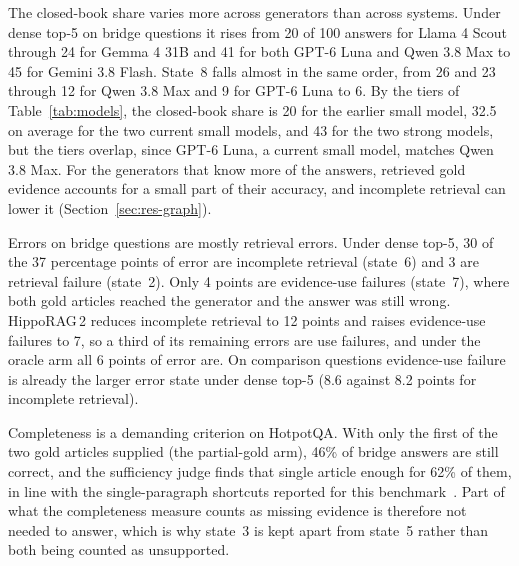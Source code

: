 \documentclass[preprint,12pt]{elsarticle}
\begin{document}
The closed-book share varies more across generators than across systems.
Under dense top-5 on bridge questions it rises from 20 of 100 answers for
Llama 4 Scout through 24 for Gemma 4 31B and 41 for both GPT-6 Luna and Qwen
3.8 Max to 45 for Gemini 3.8 Flash. State~8 falls almost in the same order, from
26 and 23 through 12 for Qwen 3.8 Max and 9 for GPT-6 Luna to 6. By the tiers of
Table~\ref{tab:models}, the closed-book share is 20 for the earlier small model,
32.5 on average for the two current small models, and 43 for the two strong
models, but the tiers overlap, since GPT-6 Luna, a current small model, matches
Qwen 3.8 Max. For the generators that know more of the answers,
retrieved gold evidence accounts for a small part of their accuracy, and
incomplete retrieval can lower it (Section~\ref{sec:res-graph}).

Errors on bridge questions are mostly retrieval errors. Under dense top-5, 30
of the 37 percentage points of error are incomplete retrieval (state~6) and 3
are retrieval failure (state~2). Only 4 points are evidence-use failures
(state~7), where both gold articles reached the generator and the answer was
still wrong. HippoRAG\,2 reduces incomplete retrieval to 12 points and raises
evidence-use failures to 7, so a third of its remaining errors are use
failures, and under the oracle arm all 6 points of error are. On comparison
questions evidence-use failure is already the larger error state under dense
top-5 (8.6 against 8.2 points for incomplete retrieval).

Completeness is a demanding criterion on HotpotQA. With only the first of the
two gold articles supplied (the partial-gold arm), 46\% of bridge answers are
still correct, and the sufficiency judge finds that single article enough for
62\% of them, in line with the single-paragraph shortcuts reported for this
benchmark~\cite{min2019compositional,chen2019understanding}. Part of what the
completeness measure counts as missing evidence is therefore not needed to
answer, which is why state~3 is kept apart from state~5 rather than both being
counted as unsupported.
\end{document}
